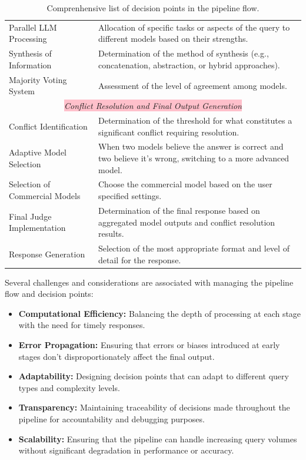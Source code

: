 \begin{table}[ht!]
{\begin{tabular}{lp{11cm}}
            Parallel LLM Processing & Allocation of specific tasks or aspects of the query to different models based on their strengths. \\
            Synthesis of Information & Determination of the method of synthesis (e.g., concatenation, abstraction, or hybrid approaches). \\
            Majority Voting System & Assessment of the level of agreement among models. \\
            \hline
            \multicolumn{2}{c}{\colorbox{pink}{\textit{Conflict Resolution and Final Output Generation}}} \\
            Conflict Identification & Determination of the threshold for what constitutes a significant conflict requiring resolution. \\
            Adaptive Model Selection & When two models believe the answer is correct and two believe it's wrong, switching to a more advanced model. \\
            Selection of Commercial Models & Choose the commercial model based on the user specified settings. \\
            Final Judge Implementation & Determination of the final response based on aggregated model outputs and conflict resolution results. \\
            Response Generation & Selection of the most appropriate format and level of detail for the response. \\
            \bottomrule
        \end{tabular}}\caption{Comprenhensive list of decision points in the pipeline flow.}
    \label{tab:pipeline-decision-points}
\end{table}

Several challenges and considerations are associated with managing the pipeline flow and decision points:
\begin{itemize}
    \item \textbf{Computational Efficiency:} Balancing the depth of processing at each stage with the need for timely responses.
    \item \textbf{Error Propagation:} Ensuring that errors or biases introduced at early stages don't disproportionately affect the final output.
    \item \textbf{Adaptability:} Designing decision points that can adapt to different query types and complexity levels.
    \item \textbf{Transparency:} Maintaining traceability of decisions made throughout the pipeline for accountability and debugging purposes.
    \item \textbf{Scalability:} Ensuring that the pipeline can handle increasing query volumes without significant degradation in performance or accuracy.
\end{itemize}

